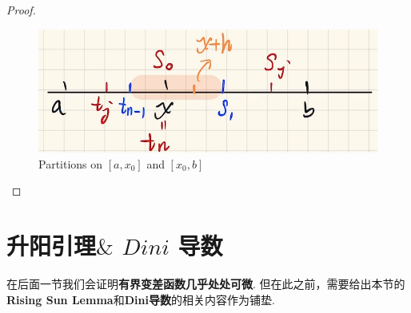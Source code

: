 \begin{proposition}
\begin{proof}
\begin{enumerate}
				\begin{figure}[thbp!]
					\centering
					\includegraphics[width=0.6\linewidth]{figure/4.4.3-1}
					\caption{Partitions on $[a , x_0]$ and $[x_0 , b]$}
					\label{pic : 4.4.3-1} %
				\end{figure}
			\end{enumerate}
		\end{proof}
	\end{proposition}

\newpage
\section{升阳引理$\&$ $Dini$ 导数}
	\begin{center}
		在后面一节我们会证明\textbf{有界变差函数几乎处处可微}. 但在此之前，需要给出本节的\textbf{Rising Sun Lemma}和\textbf{Dini导数}的相关内容作为铺垫.
	\end{center}

\vspace{2em}
